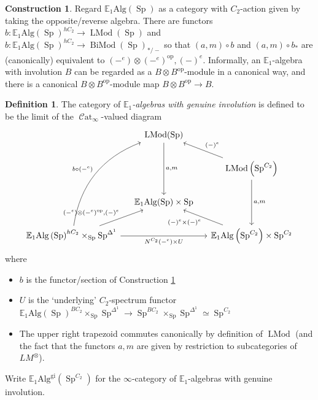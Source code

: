 \documentclass{article}
\DeclareMathOperator{\Cat}{\mathcal{C}at} %
\DeclareMathOperator{\LMod}{LMod} %
\DeclareMathOperator{\BiMod}{BiMod} %
\DeclareMathOperator{\Spectra}{Sp} %
\newcommand{\op}{\mathrm{op}} %
\theoremstyle{definition}
\newtheorem{definition}[equation]{Definition}
\newtheorem{construction}[equation]{Construction}
\begin{document}
\begin{construction}\label{cons:alg_inv_is_bimod_canonically}
    Regard $ \mathbb{E}_1\mathrm{Alg}(\Spectra) $ as a category with $ C_2 $-action given by taking the opposite/reverse algebra.  
    There are functors $ b \colon \mathbb{E}_1\mathrm{Alg}\left(\Spectra\right)^{hC_2} \to \LMod(\Spectra) $ and $ b \colon \mathbb{E}_1\mathrm{Alg}\left(\Spectra\right)^{hC_2} \to \BiMod(\Spectra)_{*/-} $ so that $ (a, m) \circ b $ and $ (a, m)\circ b_* $ are (canonically) equivalent to $ (-^e) \otimes(-^ e)^\mathrm{op}, (-)^e $. 
    Informally, an $ \mathbb{E}_1 $-algebra with involution $ B $ can be regarded as a $ B \otimes B^\op $-module in a canonical way, and there is a canonical $ B \otimes B^\op $-module map $ B \otimes B^\op \to B $. 
\end{construction}
\begin{definition}
    The category of \emph{$\mathbb{E}_1$-algebras with genuine involution} is defined to be the limit of the $\Cat_\infty$-valued diagram 
    \begin{equation}\label{diagram:E1_alg_gen_involution}
    \begin{tikzcd}[column sep=small]
        & \LMod(\Spectra) \ar[dd,"{a,m}"]  & \\
        & & \LMod\left(\Spectra^{C_2}\right) \ar[dd,"{a, m}"] \ar[lu,"{(-)^e}"'] \\
        &\mathbb{E}_1\mathrm{Alg}(\Spectra) \times \Spectra & \\
        \mathbb{E}_1\mathrm{Alg}\left(\Spectra\right)^{hC_2} \times_{\Spectra} \Spectra^{\Delta^1}  \ar[rr,"{N^{C_2}(-^e) \times U}"'] \ar[ru,"{(-^e) \otimes(-^ e)^\mathrm{op}, (-)^e}"] \ar[ruuu,"{b \circ (-^e)}", bend left=30] & &\mathbb{E}_1\mathrm{Alg}\left(\Spectra^{C_2}\right) \times \Spectra^{C_2} \ar[lu,"{(-)^e \times (-)^e}"]
    \end{tikzcd}
    \end{equation}
    where
    \begin{itemize}
        \item $ b $ is the functor/section of Construction \ref{cons:alg_inv_is_bimod_canonically} 
        \item $ U $ is the `underlying' $C_2$-spectrum functor $ \mathbb{E}_1\mathrm{Alg}\left(\Spectra\right)^{BC_2} \times_{\Spectra} \Spectra^{\Delta^1} \to \Spectra^{BC_2} \times_{\Spectra} \Spectra^{\Delta^1} \simeq \Spectra^{C_2} $ 
        \item The upper right trapezoid commutes canonically by definition of $ \LMod $ (and the fact that the functors $ a, m $ are given by restriction to subcategories of $ LM^\otimes $). 
    \end{itemize}
    Write $ \mathbb{E}_1\mathrm{Alg}^{\mathrm{gi}}\left(\Spectra^{C_2}\right) $ for the $\infty $-category of $\mathbb{E}_1$-algebras with genuine involution. 
\end{definition}
\end{document}
